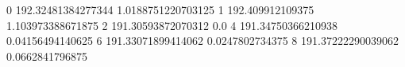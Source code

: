 0 192.32481384277344 1.0188751220703125
1 192.409912109375 1.103973388671875
2 191.30593872070312 0.0
4 191.34750366210938 0.04156494140625
6 191.33071899414062 0.0247802734375
8 191.37222290039062 0.0662841796875
